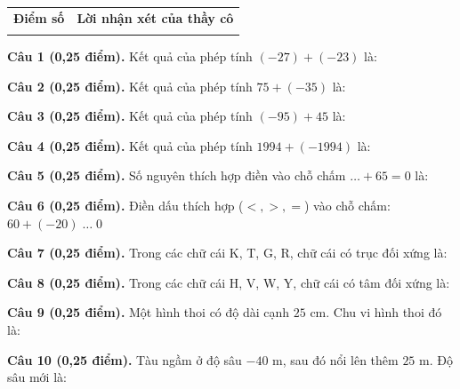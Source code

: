 \documentclass[12pt,a4paper]{article}
\begin{document}
\vspace{1.0mm}

\noindent
\begin{tabularx}{\linewidth}{|p{3.2cm}|X|}
\hline
\centering\textbf{Điểm số} & \centering\textbf{Lời nhận xét của thầy cô} \tabularnewline
\rule{0pt}{1.8cm} & \\
\hline
\end{tabularx}

\vspace{1.0mm}
\noindent\textbf{Câu 1 (0,25 điểm).} Kết quả của phép tính $(-27) + (-23)$ là: \par\vspace{0.25mm}
\noindent\textbf{Câu 2 (0,25 điểm).} Kết quả của phép tính $75 + (-35)$ là: \par\vspace{0.25mm}
\noindent\textbf{Câu 3 (0,25 điểm).} Kết quả của phép tính $(-95) + 45$ là: \par\vspace{0.25mm}
\noindent\textbf{Câu 4 (0,25 điểm).} Kết quả của phép tính $1994 + (-1994)$ là: \par\vspace{0.25mm}
\noindent\textbf{Câu 5 (0,25 điểm).} Số nguyên thích hợp điền vào chỗ chấm $\dots + 65 = 0$ là: \par\vspace{0.25mm}
\noindent\textbf{Câu 6 (0,25 điểm).} Điền dấu thích hợp ($<, >, =$) vào chỗ chấm: $60 + (-20) \; \dots \; 0$ \shortans{>}\par\vspace{0.25mm}
\noindent\textbf{Câu 7 (0,25 điểm).} Trong các chữ cái K, T, G, R, chữ cái có trục đối xứng là: \par\vspace{0.25mm}
\noindent\textbf{Câu 8 (0,25 điểm).} Trong các chữ cái H, V, W, Y, chữ cái có tâm đối xứng là: \par\vspace{0.25mm}
\noindent\textbf{Câu 9 (0,25 điểm).} Một hình thoi có độ dài cạnh $25\text{ cm}$. Chu vi hình thoi đó là: \par\vspace{0.25mm}
\noindent\textbf{Câu 10 (0,25 điểm).} Tàu ngầm ở độ sâu $-40\text{ m}$, sau đó nổi lên thêm $25\text{ m}$. Độ sâu mới là: \par\vspace{0.25mm}
\end{document}
